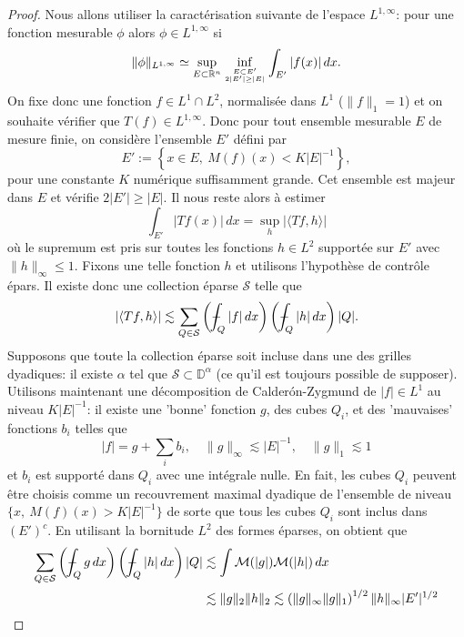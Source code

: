 \documentclass[11pt]{amsart}
\newcommand{\rr}{\mathbb}
\newcommand{\mcS}{{\mathcal S}}
\newcommand{\Dy}{{\mathbb D}}
\def\Xint#1{\mathchoice
   {\XXint\displaystyle\textstyle{#1}}%
   {\XXint\textstyle\scriptstyle{#1}}%
   {\XXint\scriptstyle\scriptscriptstyle{#1}}%
   {\XXint\scriptscriptstyle\scriptscriptstyle{#1}}%
   \!\int}
\def\XXint#1#2#3{{\setbox0=\hbox{$#1{#2#3}{\int}$}
     \vcenter{\hbox{$#2#3$}}\kern-.5\wd0}}
\def\aver#1{\Xint-_{#1}}
\begin{document}
\begin{proof} Nous allons utiliser la caract\'erisation suivante de l'espace $L^{1,\infty}$: pour une fonction mesurable $\phi$ alors $\phi \in L^{1,\infty}$ si
\begin{equation} \|\phi\|_{L^{1,\infty}} \simeq \sup_{E \subset {\rr R}^n} \inf_{\genfrac{}{}{0pt}{}{E \subset E'}{2 |E'|\geq |E|}}  \int_{E'} |f(x)|\, dx. \label{eq:caracterisationL1faible} \end{equation}
On fixe donc une fonction $f\in L^1\cap L^2$, normalis\'ee dans $L^1$ ($\|f\|_1=1$) et on souhaite v\'erifier que $T(f) \in L^{1,\infty}$. Donc pour tout ensemble mesurable $E$ de mesure finie, on consid\`ere l'ensemble $E'$ d\'efini par
$$ E':=\left\{ x\in E, \ M(f)(x)<K|E|^{-1} \right\},$$
pour une constante $K$ num\'erique suffisamment grande. Cet ensemble est majeur dans $E$ et v\'erifie $2|E'|\geq |E|$. Il nous reste alors \`a estimer
\begin{equation} \int_{E'} |Tf(x)|\, dx = \sup_{h} \left| \langle Tf, h \rangle \right| \label{eq:sup}
\end{equation}
o\`u le supremum est pris sur toutes les fonctions $h\in L^2$ support\'ee sur $E'$ avec $\|h\|_\infty\leq 1$.
Fixons une telle fonction $h$ et utilisons l'hypoth\`ese de contr\^ole \'epars. Il existe donc une collection \'eparse $\mcS$ telle que
$$ \left| \langle Tf, h \rangle \right| \lesssim  \sum_{Q\in \mcS} \left(\aver{Q} |f|\, dx \right) \left(\aver{Q} |h|\, dx \right) |Q|.$$
Supposons que toute la collection \'eparse soit incluse dans une des grilles dyadiques: il existe $\alpha$ tel que $\mcS \subset \Dy^\alpha$ (ce qu'il est toujours possible de supposer). 
Utilisons maintenant une d\'ecomposition de Calder\'on-Zygmund de $|f|\in L^1$ au niveau $K|E|^{-1}$: il existe une 'bonne' fonction $g$, des cubes $Q_i$, et des 'mauvaises' fonctions $b_i$ telles que 
$$ |f| = g + \sum_i b_i, \quad \|g\|_\infty \lesssim |E|^{-1}, \quad \|g\|_1\lesssim 1$$
et $b_i$ est support\'e dans $Q_i$ avec une int\'egrale nulle. En fait, les cubes $Q_i$ peuvent \^etre choisis comme un recouvrement maximal dyadique de l'ensemble de niveau $\{x,\ M(f)(x)> K|E|^{-1} \}$ de sorte que tous les cubes $Q_i$ sont inclus dans $(E')^c$. 
En utilisant la bornitude $L^2$ des formes \'eparses, on obtient que
\begin{align*}
 \sum_{Q\in \mcS} \left(\aver{Q} g\, dx \right) \left(\aver{Q} |h|\, dx \right) |Q| & \lesssim \int {\mathcal M}(|g|) {\mathcal M}(|h|) \, dx \\
 & \lesssim \|g\|_2 \|h\|_2 \lesssim \left(\|g\|_\infty \|g\|_1\right)^{1/2} \|h\|_\infty |E'|^{1/2} \\

\end{align*}
\end{proof}
\end{document}
